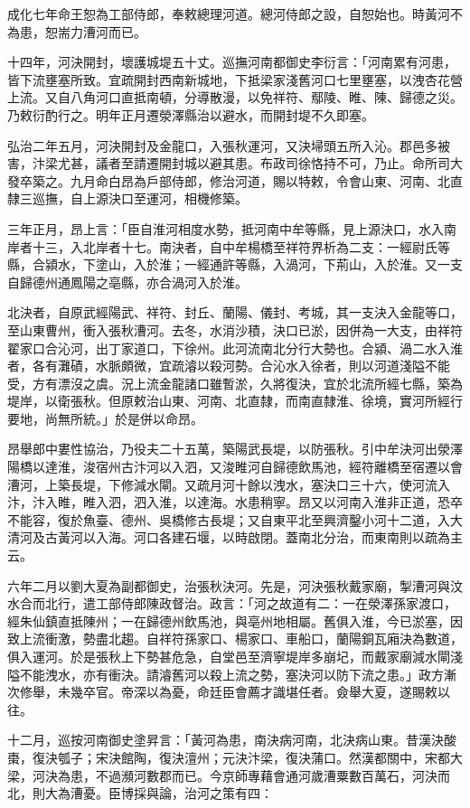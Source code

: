 成化七年命王恕為工部侍郎，奉敕總理河道。總河侍郎之設，自恕始也。時黃河不為患，恕耑力漕河而已。

十四年，河決開封，壞護城堤五十丈。巡撫河南都御史李衍言：「河南累有河患，皆下流壅塞所致。宜疏開封西南新城地，下抵梁家淺舊河口七里壅塞，以洩杏花營上流。又自八角河口直抵南頓，分導散漫，以免祥符、鄢陵、睢、陳、歸德之災。乃敕衍酌行之。明年正月遷滎澤縣治以避水，而開封堤不久即塞。

弘治二年五月，河決開封及金龍口，入張秋運河，又決埽頭五所入沁。郡邑多被害，汴梁尤甚，議者至請遷開封城以避其患。布政司徐恪持不可，乃止。命所司大發卒築之。九月命白昂為戶部侍郎，修治河道，賜以特敕，令會山東、河南、北直隸三巡撫，自上源決口至運河，相機修築。

三年正月，昂上言：「臣自淮河相度水勢，抵河南中牟等縣，見上源決口，水入南岸者十三，入北岸者十七。南決者，自中牟楊橋至祥符界析為二支：一經尉氏等縣，合潁水，下塗山，入於淮；一經通許等縣，入渦河，下荊山，入於淮。又一支自歸德州通鳳陽之亳縣，亦合渦河入於淮。

北決者，自原武經陽武、祥符、封丘、蘭陽、儀封、考城，其一支決入金龍等口，至山東曹州，衝入張秋漕河。去冬，水消沙積，決口已淤，因併為一大支，由祥符翟家口合沁河，出丁家道口，下徐州。此河流南北分行大勢也。合潁、渦二水入淮者，各有灘磧，水脈頗微，宜疏濬以殺河勢。合沁水入徐者，則以河道淺隘不能受，方有漂沒之虞。況上流金龍諸口雖暫淤，久將復決，宜於北流所經七縣，築為堤岸，以衛張秋。但原敕治山東、河南、北直隸，而南直隸淮、徐境，實河所經行要地，尚無所統。」於是併以命昂。

昂舉郎中婁性協治，乃役夫二十五萬，築陽武長堤，以防張秋。引中牟決河出滎澤陽橋以達淮，浚宿州古汴河以入泗，又浚睢河自歸德飲馬池，經符離橋至宿遷以會漕河，上築長堤，下修減水閘。又疏月河十餘以洩水，塞決口三十六，使河流入汴，汴入睢，睢入泗，泗入淮，以達海。水患稍寧。昂又以河南入淮非正道，恐卒不能容，復於魚臺、德州、吳橋修古長堤；又自東平北至興濟鑿小河十二道，入大清河及古黃河以入海。河口各建石堰，以時啟閉。蓋南北分治，而東南則以疏為主云。

六年二月以劉大夏為副都御史，治張秋決河。先是，河決張秋戴家廟，掣漕河與汶水合而北行，遣工部侍郎陳政督治。政言：「河之故道有二：一在滎澤孫家渡口，經朱仙鎮直抵陳州；一在歸德州飲馬池，與亳州地相屬。舊俱入淮，今已淤塞，因致上流衝激，勢盡北趨。自祥符孫家口、楊家口、車船口，蘭陽銅瓦廂決為數道，俱入運河。於是張秋上下勢甚危急，自堂邑至濟寧堤岸多崩圮，而戴家廟減水閘淺隘不能洩水，亦有衝決。請濬舊河以殺上流之勢，塞決河以防下流之患。」政方漸次修舉，未幾卒官。帝深以為憂，命廷臣會薦才識堪任者。僉舉大夏，遂賜敕以往。

十二月，巡按河南御史塗昇言：「黃河為患，南決病河南，北決病山東。昔漢決酸棗，復決瓠子；宋決館陶，復決澶州；元決汴梁，復決蒲口。然漢都關中，宋都大梁，河決為患，不過瀕河數郡而已。今京師專藉會通河歲漕粟數百萬石，河決而北，則大為漕憂。臣博採與論，治河之策有四：


